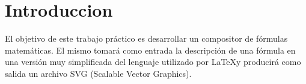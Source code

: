 \section{Introduccion}
El objetivo de este trabajo pr\'actico es desarrollar un compositor de f\'ormulas matem\'aticas. El mismo tomar\'a como entrada la descripci\'on de una f\'ormula en una versi\'on muy simplificada del lenguaje utilizado por \LaTeX \hspace{0.1cm}y producir\'a como salida un archivo SVG (Scalable Vector Graphics).